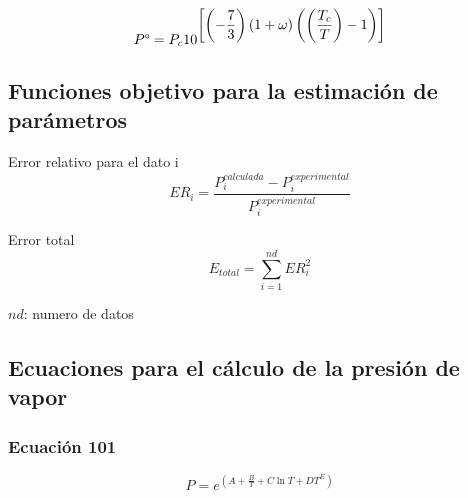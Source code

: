 \begin{equation}\label{eq:pressureacentricfactor}
 P\degree= P_c 10^{\displaystyle\left[\left(-\frac{7}{3}\right) \left(1+\omega \right)  \left(\left(\frac{T_c}{T}\right) - 1 \right) \right]}
\end{equation}


\subsection{Funciones objetivo para la estimación de parámetros}
Error relativo para el dato i
\begin{equation}\label{eq:relativeerror}
ER_i=\frac{P_i^{calculada} - P_i^{experimental}}{P_i^{experimental}}
\end{equation}

Error total
\begin{equation}\label{eq:totalerror}
	E_{total} = \sum_{i=1}^{nd} ER_i^2
\end{equation}

$nd$: numero de datos



\subsection{Ecuaciones para el cálculo de la presión de vapor}

\subsubsection{Ecuación 101}
\begin{equation}\label{eq:101vaporpressure}
	P =e^{\displaystyle\left(A +\frac{B}{T}+C\ln{T}+D {T^E}\right)}
\end{equation}